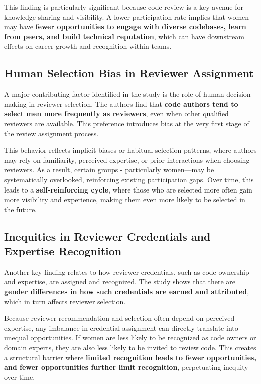 This finding is particularly significant because code review is a key avenue for knowledge sharing and visibility. A lower participation rate implies that women may have \textbf{fewer opportunities to engage with diverse codebases, learn from peers, and build technical reputation}, which can have downstream effects on career growth and recognition within teams.

\subsection{Human Selection Bias in Reviewer Assignment}
A major contributing factor identified in the study is the role of human decision-making in reviewer selection. The authors find that \textbf{code authors tend to select men more frequently as reviewers}, even when other qualified reviewers are available. This preference introduces bias at the very first stage of the review assignment process.

This behavior reflects implicit biases or habitual selection patterns, where authors may rely on familiarity, perceived expertise, or prior interactions when choosing reviewers. As a result, certain groups - particularly women—may be systematically overlooked, reinforcing existing participation gaps. Over time, this leads to a \textbf{self-reinforcing cycle}, where those who are selected more often gain more visibility and experience, making them even more likely to be selected in the future.

\subsection{Inequities in Reviewer Credentials and Expertise Recognition}
Another key finding relates to how reviewer credentials, such as code ownership and expertise, are assigned and recognized. The study shows that there are \textbf{gender differences in how such credentials are earned and attributed}, which in turn affects reviewer selection.

Because reviewer recommendation and selection often depend on perceived expertise, any imbalance in credential assignment can directly translate into unequal opportunities. If women are less likely to be recognized as code owners or domain experts, they are also less likely to be invited to review code. This creates a structural barrier where \textbf{limited recognition leads to fewer opportunities, and fewer opportunities further limit recognition}, perpetuating inequity over time.

